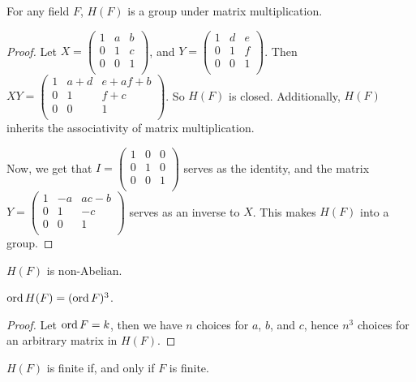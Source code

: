 \begin{lemma}\label{1.5.4}
    For any field $F$,  $H(F)$ is a group under matrix multiplication.
\end{lemma}
\begin{proof}
    Let $X=\begin{pmatrix}
                1   &   a   &   b   \\
                0   &   1   &   c   \\
                0   &   0   &   1   \\
           \end{pmatrix}$, and
         $Y=\begin{pmatrix}
                1   &   d   &   e   \\
                0   &   1   &   f   \\
                0   &   0   &   1   \\
           \end{pmatrix}$. Then
          $XY=\begin{pmatrix}
                1   &  a+d  &   e+af+b  \\
                0   &   1   &   f+c     \\
                0   &   0   &   1   \\
              \end{pmatrix}$.
    So $H(F)$ is closed. Additionally, $H(F)$ inherits the associativity of
    matrix multiplication.

    Now, we get that $I=\begin{pmatrix}
                            1    &   0   &   0   \\
                            0    &   1   &   0   \\
                            0    &   0   &   1   \\
                        \end{pmatrix}$
    serves as the identity, and the matrix $Y=\begin{pmatrix}
                                                1   &  -a   &   ac-b    \\
                                                0   &   1   &   -c      \\
                                                0   &   0   &   1       \\
                                              \end{pmatrix}$
    serves as an inverse to $X$. This makes  $H(F)$ into a group.
\end{proof}
\begin{corollary}
    $H(F)$ is non-Abelian.
\end{corollary}
\begin{corollary}
    $\operatorname{ord}{H(F)}=(\operatorname{ord}{F})^3$.
\end{corollary}
\begin{proof}
    Let $\operatorname{ord}{F}=k$, then we have $n$ choices for  $a$,  $b$, and  $c$, hence
    $n^3$ choices for an arbitrary matrix in  $H(F)$.
\end{proof}
\begin{corollary}
    $H(F)$ is finite if, and only if $F$ is finite.
\end{corollary}
